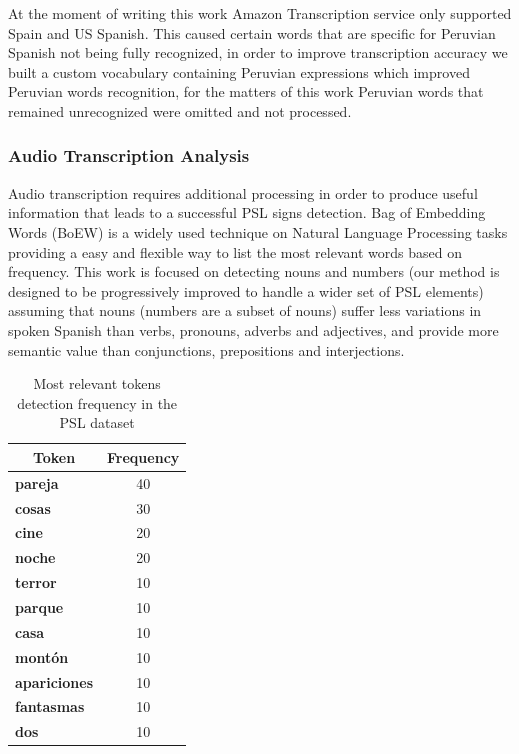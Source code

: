 \documentclass[twocolumn,conference]{article}
\begin{document}
At the moment of writing this work Amazon Transcription service only supported Spain and US Spanish. This caused certain words that are specific for Peruvian Spanish not being fully recognized, in order to improve transcription accuracy we built a custom vocabulary containing Peruvian expressions which improved  Peruvian words recognition, for the matters of this work Peruvian words that remained unrecognized were omitted and not processed.

\subsubsection{Audio Transcription Analysis}\label{audio-transcription-analysis}
Audio transcription requires additional processing in order to produce useful information that leads to a successful PSL signs detection. Bag of Embedding Words (BoEW) is a widely used technique on Natural Language Processing tasks providing a easy and flexible way to list the most relevant words based on frequency. This work is focused on detecting nouns and numbers (our method is designed to be progressively improved to handle a wider set of PSL elements) assuming that nouns (numbers are a subset of nouns) suffer less variations in spoken Spanish than verbs, pronouns, adverbs and adjectives, and provide more semantic value than conjunctions, prepositions and interjections. 

\begin{table}[!htb]
\captionsetup{size=footnotesize}
\begin{tabular}{ p{16em} c}
\toprule
\multicolumn{1}{c}{\textbf{Token}} & 
	\multicolumn{1}{c}{\textbf{Frequency}}\\
\midrule
\textbf{pareja}&	40\\
\textbf{cosas}&	30\\
\textbf{cine}&	20\\
\textbf{noche}&	20\\
\textbf{terror}&	10\\
\textbf{parque}&	10\\
\textbf{casa}&	10\\
\textbf{montón}&	10\\
\textbf{apariciones}&	10\\
\textbf{fantasmas}&	10\\
\textbf{dos}&	10\\
\bottomrule
\end{tabular}
\caption{Most relevant tokens detection frequency in the PSL dataset} \label{tab:token-freq}
\end{table}
\end{document}
